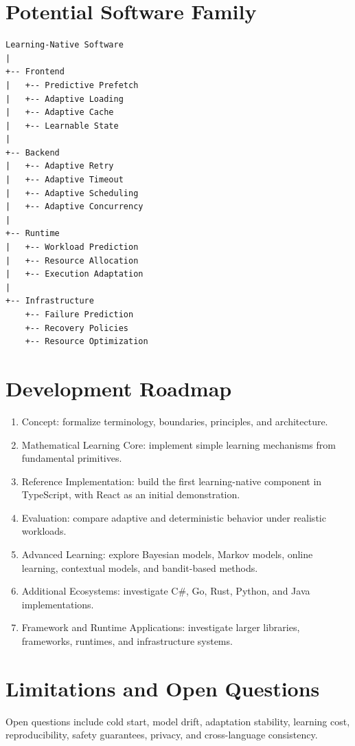 \documentclass[11pt,a4paper]{article}
\begin{document}
\section{Potential Software Family}
\begin{lstlisting}
Learning-Native Software
|
+-- Frontend
|   +-- Predictive Prefetch
|   +-- Adaptive Loading
|   +-- Adaptive Cache
|   +-- Learnable State
|
+-- Backend
|   +-- Adaptive Retry
|   +-- Adaptive Timeout
|   +-- Adaptive Scheduling
|   +-- Adaptive Concurrency
|
+-- Runtime
|   +-- Workload Prediction
|   +-- Resource Allocation
|   +-- Execution Adaptation
|
+-- Infrastructure
    +-- Failure Prediction
    +-- Recovery Policies
    +-- Resource Optimization
\end{lstlisting}

\section{Development Roadmap}
\begin{enumerate}
\item Concept: formalize terminology, boundaries, principles, and architecture.
\item Mathematical Learning Core: implement simple learning mechanisms from fundamental primitives.
\item Reference Implementation: build the first learning-native component in TypeScript, with React as an initial demonstration.
\item Evaluation: compare adaptive and deterministic behavior under realistic workloads.
\item Advanced Learning: explore Bayesian models, Markov models, online learning, contextual models, and bandit-based methods.
\item Additional Ecosystems: investigate C\#, Go, Rust, Python, and Java implementations.
\item Framework and Runtime Applications: investigate larger libraries, frameworks, runtimes, and infrastructure systems.
\end{enumerate}

\section{Limitations and Open Questions}
Open questions include cold start, model drift, adaptation stability, learning cost, reproducibility, safety guarantees, privacy, and cross-language consistency.
\end{document}
